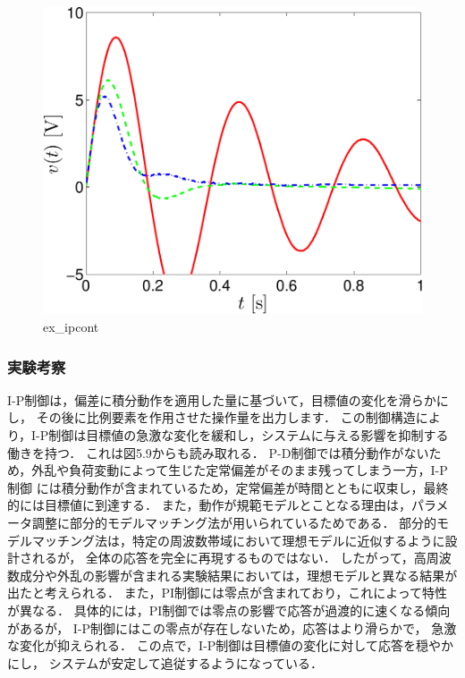 \begin{figure}[h]
  \centering
  \includegraphics[scale=0.5]{sozai/figure_ipcont_volt-crop.pdf}
  \caption{ex\_ipcont}
\end{figure}

\newpage

\subsubsection{実験考察}
I-P制御は，偏差に積分動作を適用した量に基づいて，目標値の変化を滑らかにし，
その後に比例要素を作用させた操作量を出力します．
この制御構造により，I-P制御は目標値の急激な変化を緩和し，システムに与える影響を抑制する働きを持つ．
これは図5.9からも読み取れる．
P-D制御では積分動作がないため，外乱や負荷変動によって生じた定常偏差がそのまま残ってしまう一方，I-P制御
には積分動作が含まれているため，定常偏差が時間とともに収束し，最終的には目標値に到達する．
また，動作が規範モデルとことなる理由は，パラメータ調整に部分的モデルマッチング法が用いられているためである．
部分的モデルマッチング法は，特定の周波数帯域において理想モデルに近似するように設計されるが，
全体の応答を完全に再現するものではない．
したがって，高周波数成分や外乱の影響が含まれる実験結果においては，理想モデルと異なる結果が出たと考えられる．
また，PI制御には零点が含まれており，これによって特性が異なる．
具体的には，PI制御では零点の影響で応答が過渡的に速くなる傾向があるが，
I-P制御にはこの零点が存在しないため，応答はより滑らかで，
急激な変化が抑えられる．
この点で，I-P制御は目標値の変化に対して応答を穏やかにし，
システムが安定して追従するようになっている．


